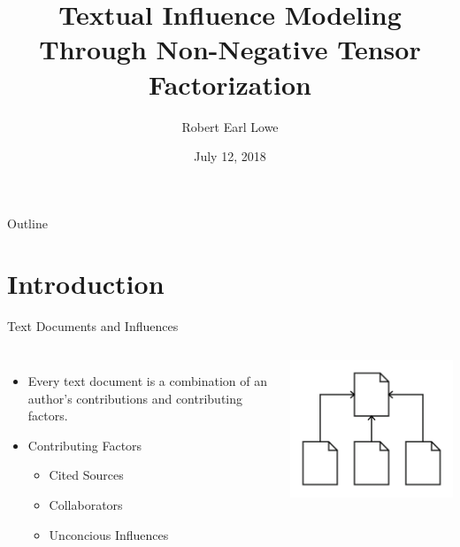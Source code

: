 \documentclass[handout]{beamer}
\title[Textual Influence Modeling]{Textual Influence Modeling Through Non-Negative Tensor Factorization}
\author{Robert Earl Lowe}
\date[]{July 12, 2018}
\begin{document}

\begin{frame}
  \titlepage
\end{frame}

\begin{frame}{Outline}
  \tableofcontents
\end{frame}

\section{Introduction}
\begin{frame}{Text Documents and Influences}
\begin{columns}
\begin{itemize}[<+->]
  \item Every text document is a combination of an author's contributions and contributing factors.
  \item Contributing Factors
  \begin{itemize}
    \item Cited Sources
    \item Collaborators
    \item Unconcious Influences
  \end{itemize}
\end{itemize}

\includegraphics[width=\textwidth]{images/Citations}
\end{columns}
\end{frame}
\end{document}
